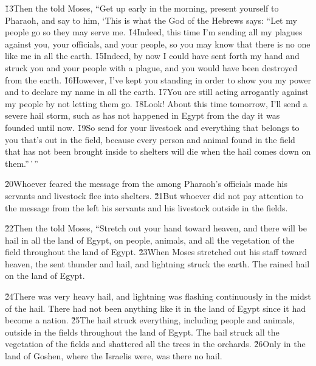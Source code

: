 \v{13}Then the  told Moses, ``Get up early in the morning, present yourself to Pharaoh, and say to him, `This is what the  God of the Hebrews says: ``Let my people go so they may serve me. \v{14}Indeed, this time I'm sending all my plagues against you, your officials, and your people, so you may know that there is no one like me in all the earth. \v{15}Indeed, by now I could have sent forth my hand and struck you and your people with a plague, and you would have been destroyed from the earth. \v{16}However, I've kept you standing in order to show you my power and to declare my name in all the earth. \v{17}You are still acting arrogantly against my people by not letting them go. \v{18}Look! About this time tomorrow, I'll send a severe hail storm, such as has not happened in Egypt from the day it was founded until now. \v{19}So send for your livestock and everything that belongs to you that's out in the field, because every person and animal found in the field that has not been brought inside to shelters will die when the hail comes down on them.''\,'\,''

\v{20}Whoever feared the message from the  among Pharaoh's officials made his servants and livestock flee into shelters. \v{21}But whoever did not pay attention to the message from the  left his servants and his livestock outside in the fields.

\v{22}Then the  told Moses, ``Stretch out your hand toward heaven, and there will be hail in all the land of Egypt, on people, animals, and all the vegetation of the field throughout the land of Egypt. \v{23}When Moses stretched out his staff toward heaven, the  sent thunder and hail, and lightning struck the earth. The  rained hail on the land of Egypt.

\v{24}There was very heavy hail, and lightning was flashing continuously in the midst of the hail. There had not been anything like it in the land of Egypt since it had become a nation. \v{25}The hail struck everything, including people and animals, outside in the fields throughout the land of Egypt. The hail struck all the vegetation of the fields and shattered all the trees in the orchards. \v{26}Only in the land of Goshen, where the Israelis were, was there no hail.

